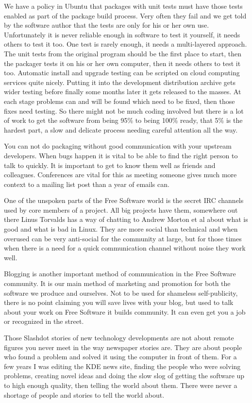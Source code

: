 We have a policy in Ubuntu that packages with unit tests must have those tests
enabled as part of the package build process. Very often they fail and we get
told by the software author that the tests are only for his or her own use.
Unfortunately it is never reliable enough in software to test it yourself, it
needs others to test it too. One test is rarely enough, it needs a multi-layered
approach. The unit tests from the original program should be the first place to
start, then the packager tests it on his or her own computer, then it needs
others to test it too. Automatic install and upgrade testing can be scripted on
cloud computing services quite nicely. Putting it into the development
distribution archive gets wider testing before finally some months later it gets
released to the masses. At each stage problems can and will be found which need
to be fixed, then those fixes need testing. So there might not be much coding
involved but there is a lot of work to get the software from being 95\% to being
100\% ready, that 5\% is the hardest part, a slow and delicate process needing
careful attention all the way.

You can not do packaging without good communication with your upstream
developers. When bugs happen it is vital to be able to find the right person to
talk to quickly. It is important to get to know them well as friends and
colleagues. Conferences are vital for this as meeting someone gives much more
context to a mailing list post than a year of emails can. 

One of the unspoken parts of the Free Software world is the secret IRC channels
used by core members of a project. All big projects have them, somewhere out
there Linus Torvalds has a way of chatting to Andrew Morton et al about what is
good and what is bad in Linux. They are more social than technical and when
overused can be very anti-social for the community at large, but for those times
when there is a need for a quick communication channel without noise they work
well.

Blogging is another important method of communication in the Free Software
community. It is our main method of marketing and promotion for both the
software we produce and ourselves. Not to be used for shameless self-publicity,
there is no point claiming you will save lives with your blog, but used to talk
about your work on Free Software it builds community. It can even get you a job
or recognized in the street.

Those Slashdot stories of new technology developments are not about remote
figures you never meet in the way newspaper stories are. They are about people
who found a problem and solved it using the computer in front of them. For a few
years I was editing the KDE news site, finding the people who were solving
problems, creating novel ideas and doing the slow slog of getting the software
up to high enough quality, then telling the world about them. There were never a
shortage of people and stories to tell the world about. 

